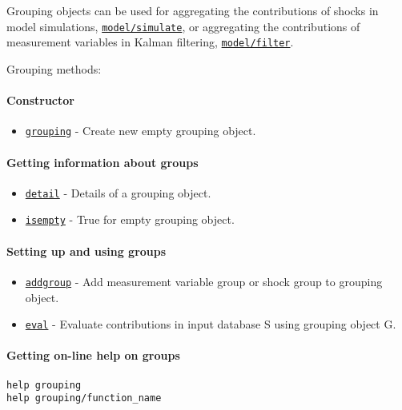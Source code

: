 

	Grouping objects can be used for aggregating the contributions of shocks
in model simulations, \href{model/simulate}{\texttt{model/simulate}}, or
aggregating the contributions of measurement variables in Kalman
filtering, \href{model/filter}{\texttt{model/filter}}.

Grouping methods:

\paragraph{Constructor}\label{constructor}

\begin{itemize}
\itemsep1pt\parskip0pt
\item
  \href{grouping/grouping}{\texttt{grouping}} - Create new empty
  grouping object.
\end{itemize}

\paragraph{Getting information about
groups}\label{getting-information-about-groups}

\begin{itemize}
\itemsep1pt\parskip0pt
\item
  \href{grouping/detail}{\texttt{detail}} - Details of a grouping
  object.
\item
  \href{grouping/isempty}{\texttt{isempty}} - True for empty grouping
  object.
\end{itemize}

\paragraph{Setting up and using
groups}\label{setting-up-and-using-groups}

\begin{itemize}
\itemsep1pt\parskip0pt
\item
  \href{grouping/addgroup}{\texttt{addgroup}} - Add measurement variable
  group or shock group to grouping object.
\item
  \href{grouping/eval}{\texttt{eval}} - Evaluate contributions in input
  database S using grouping object G.
\end{itemize}

\paragraph{Getting on-line help on
groups}\label{getting-on-line-help-on-groups}

\begin{verbatim}
help grouping
help grouping/function_name
\end{verbatim}



